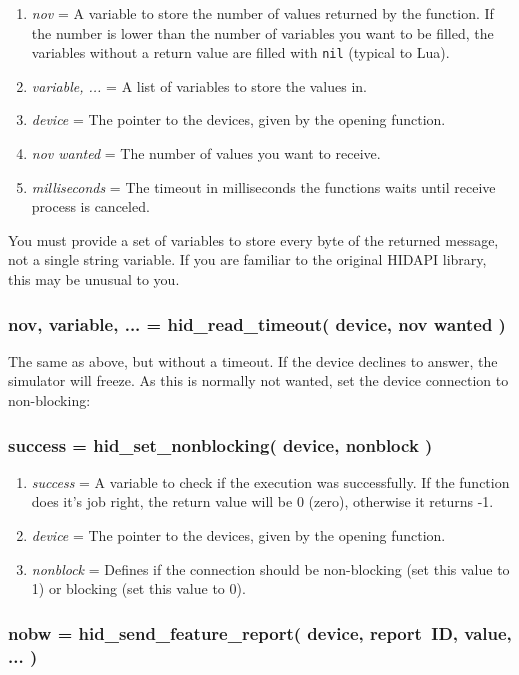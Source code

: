 \documentclass[11pt,parskip=half,a4paper]{scrartcl}
\begin{document}
\begin{enumerate}
\item \emph{nov} = A variable to store the number of values returned by the function. If the number is lower than the number of variables you want to be filled, the variables without a return value are filled with \verb|nil| (typical to Lua).
\item \emph{variable, ...} = A list of variables to store the values in.
\item \emph{device} = The pointer to the devices, given by the opening function.
\item \emph{nov wanted} = The number of values you want to receive.
\item \emph{milliseconds} = The timeout in milliseconds the functions waits until receive process is canceled.
\end{enumerate}

You must provide a set of variables to store every byte of the returned message, not a single string variable. If you are familiar to the original HIDAPI library, this may be unusual to you.

\subsubsection{nov, variable, ... = hid\_read\_timeout( device, nov wanted )}

The same as above, but without a timeout. If the device declines to answer, the simulator will freeze. As this is normally not wanted, set the device connection to non-blocking:

\subsubsection{success = hid\_set\_nonblocking( device, nonblock )}

\begin{enumerate}
\item \emph{success} = A variable to check if the execution was successfully. If the function does it's job right, the return value will be 0 (zero), otherwise it returns -1.
\item \emph{device} = The pointer to the devices, given by the opening function.
\item \emph{nonblock} = Defines if the connection should be non-blocking (set this value to 1) or blocking (set this value to 0).
\end{enumerate}

\subsubsection{nobw = hid\_send\_feature\_report( device, report~ID, value, ... )}
\end{document}
